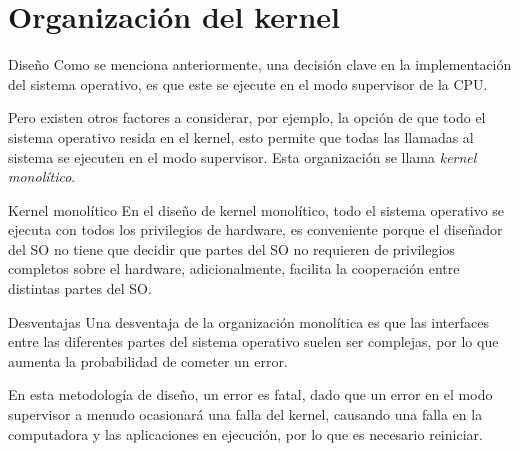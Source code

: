 \documentclass{libs/ufc_format}
\begin{document}
\section{Organización del kernel}
\begin{frame}{Diseño}
  Como se menciona anteriormente, una decisión clave en la implementación del sistema operativo, es que este se ejecute en el modo supervisor de la CPU.

  \vspace{0.3cm}

  Pero existen otros factores a considerar, por ejemplo, la opción de que todo el sistema operativo resida en el kernel, esto permite que todas las llamadas al sistema se ejecuten en el modo supervisor. Esta organización se llama \emph{kernel monolítico}.
\end{frame}
\begin{frame}{Kernel monolítico}
  En el diseño de kernel monolítico, todo el sistema operativo se ejecuta con todos los privilegios de hardware, es conveniente porque el diseñador del SO no tiene que decidir que partes del SO no requieren de privilegios completos sobre el hardware, adicionalmente, facilita la cooperación entre distintas partes del SO. \newline
\end{frame}
\begin{frame}{Desventajas}
  Una desventaja de la organización monolítica es que las interfaces entre las diferentes partes del sistema operativo suelen ser complejas, por lo que aumenta la probabilidad de cometer un error.

  \vspace{0.3cm}

  En esta metodología de diseño, un error es fatal, dado que un error en el modo supervisor a menudo ocasionará una falla del kernel, causando una falla en la computadora y las aplicaciones en ejecución, por lo que es necesario reiniciar.
\end{frame}
\end{document}
